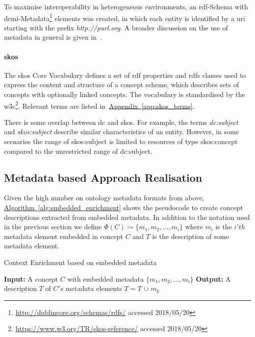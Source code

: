To maximise interoperability in heterogeneous environments, an \gls{rdf}-Schema with \gls{dcmi}-Metadata\footnote{\url{http://dublincore.org/schemas/rdfs/} accessed 2018/05/20} elements was created, in which each entity is identified by a \gls{uri} starting with the prefix \emph{http://purl.org}. A broader discussion on the use of metadata in general is given in~\cite{nilsson2010}.  

\paragraph{\gls{skos}}
The \gls{skos} Core Vocabulary \cite{skos2005} defines a set of \gls{rdf} properties and \gls{rdfs} classes
used to express the content and structure of a concept scheme, which describes sets of concepts with optionally linked concepts. The vocabulary is standardised by the \gls{w3c}\footnote{\url{https://www.w3.org/TR/skos-reference/} accessed 2018/05/20}. Relevant terms are listed in~\hyperref[app:skos_terms]{Appendix~\ref*{app:skos_terms}}.
	
There is some overlap between \gls{dc} and \gls{skos}. For example, the terms \textit{dc:subject} and \textit{skos:subject} describe similar characteristics of an entity. However, in some scenarios the range of skos:subject is limited to resources of type skos:concept compared to the unrestricted range of dc:subject. 


\subsection{Metadata based Approach Realisation}\label{sec:enrichment_metaData_approach}
Given the high number on ontology metadata formats from above, \hyperref[alg:embedded_enrichment]{Algorithm~\ref*{alg:embedded_enrichment}} shows the pseudocode to create concept descriptions extracted from embedded metadata. In addition to the notation used in the previous section we define $\Phi(C) \coloneqq \{m_1, m_2, \ldots, m_i \}$ where $m_i$ is the $i'th$ metadata element embedded in concept $C$ and $T$ is the description of some metadata element.

\begin{algorithm}
	\caption{Context Enrichment based on embedded metadata}\label{alg:embedded_enrichment}
	\begin{algorithmic}[1]
		\newline
			\textbf{Input:} A concept $C$ with embedded metadata $\{m_1, m_2, \ldots, m_i \}$\newline
			\textbf{Output:} A description $T$ of $C's$ metadata elements\newline
				\State $T=T$ $\cup$ $m_k$
			\EndFor
		\EndProcedure
	\end{algorithmic}
\end{algorithm}

